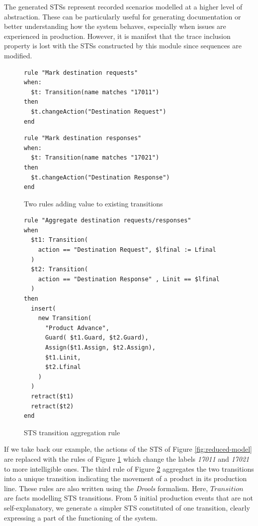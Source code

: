 The generated STSs represent recorded scenarios modelled at a
higher level of abstraction. These can be particularly useful for
generating documentation or better understanding how the system
behaves, especially when issues are experienced in production.
However, it is manifest that the trace inclusion property is lost
with the STSs constructed by this module since sequences are
modified.

\begin{figure}[ht]
\begin{framed}
\begin{BVerbatim}
rule "Mark destination requests"
when:
  $t: Transition(name matches "17011")
then
  $t.changeAction("Destination Request")
end
\end{BVerbatim}
\end{framed}

\begin{framed}
\begin{BVerbatim}
rule "Mark destination responses"
when:
  $t: Transition(name matches "17021")
then
  $t.changeAction("Destination Response")
end
\end{BVerbatim}
\end{framed}

  \caption{Two rules adding value to existing transitions}
  \label{rule:rename-tr}
\end{figure}

\begin{figure}[ht]
\begin{framed}
\begin{BVerbatim}
rule "Aggregate destination requests/responses"
when
  $t1: Transition(
    action == "Destination Request", $lfinal := Lfinal
  )
  $t2: Transition(
    action == "Destination Response" , Linit == $lfinal
  )
then
  insert(
    new Transition(
      "Product Advance",
      Guard( $t1.Guard, $t2.Guard),
      Assign($t1.Assign, $t2.Assign),
      $t1.Linit,
      $t2.Lfinal
    )
  )
  retract($t1)
  retract($t2)
end
\end{BVerbatim}
\end{framed}

  \caption{STS transition aggregation rule}
  \label{rule:aggregate-tr}
\end{figure}

If we take back our example, the actions of the STS of Figure
\ref{fig:reduced-model} are replaced with the rules of Figure
\ref{rule:rename-tr} which change the labels \textit{17011} and
\textit{17021} to more intelligible ones. The third rule of
Figure \ref{rule:aggregate-tr} aggregates the two transitions
into a unique transition indicating the movement of a product in
its production line. These rules are also written using the
\textit{Drools} formalism. Here, $Transition$ are facts modelling
STS transitions. From 5 initial production events that are not
self-explanatory, we generate a simpler STS constituted of one
transition, clearly expressing a part of the functioning of the
system.

